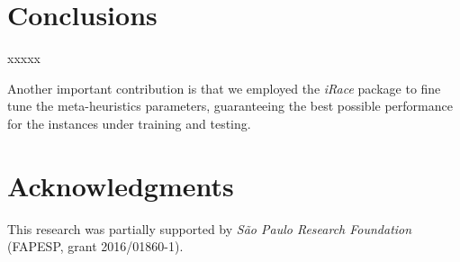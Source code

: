 \documentclass[preprint,authoryear]{elsarticle}
\begin{document}
\section{Conclusions}
\label{sec7}

xxxxx

	Another important contribution is that we employed the {\it iRace} package to fine tune the meta-heuristics parameters, guaranteeing the best possible performance for the instances under training and testing.

\section*{Acknowledgments}

This research was partially supported by \textit{São Paulo Research Foundation} (FAPESP, grant 2016/01860-1).




\end{document}
